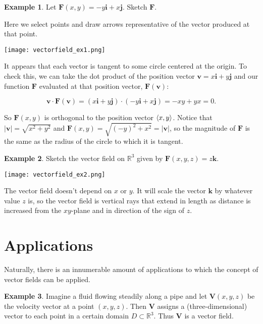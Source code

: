 \documentclass[11pt,oneside,english]{amsart}
\theoremstyle{definition}
\newtheorem*{example}{Example}
\newcommand{\R}{\mathbb{R}}
\def\<#1>{\mathinner{\langle#1\rangle}}
\begin{document}
\begin{example}
Let $\mathbf{F}(x,y)=-y\mathbf{i}+x\mathbf{j}$. Sketch $\mathbf{F}$.

Here we select points and draw arrows representative of the vector produced at that point.

\begin{center}
\texttt{[image: vectorfield\_ex1.png]}
\end{center}

It appears that each vector is tangent to some circle centered at the origin. To check this, we can take the dot product of the position vector $\mathbf{v}=x\mathbf{i}+y\mathbf{j}$ and our function $\mathbf{F}$ evaluated at that position vector, $\mathbf{F}(\mathbf{v})$:

\[
\mathbf{v}\cdot\mathbf{F}(\mathbf{v})=(x\mathbf{i}+y\mathbf{j})\cdot(-y\mathbf{i}+x\mathbf{j})=-xy+yx=0.
\]

So $\mathbf{F}(x,y)$ is orthogonal to the position vector $\<x,y>$. Notice that $|\mathbf{v}|=\sqrt{x^2+y^2}$ and $\mathbf{F}(x,y)=\sqrt{(-y)^2+x^2}=|\mathbf{v}|$, so the magnitude of $\mathbf{F}$ is the same as the radius of the circle to which it is tangent.
\end{example}

\begin{example}
Sketch the vector field on $\R^3$ given by $\mathbf{F}(x,y,z)=z\mathbf{k}$.

\begin{center}
\texttt{[image: vectorfield\_ex2.png]}
\end{center}

The vector field doesn't depend on $x$ or $y$. It will scale the vector $\mathbf{k}$ by whatever value $z$ is, so the vector field is vertical rays that extend in length as distance is increased from the $xy$-plane and in direction of the sign of $z$.
\end{example}


\section*{Applications}

Naturally, there is an innumerable amount of applications to which the concept of vector fields can be applied. 

\begin{example}
Imagine a fluid flowing steadily along a pipe and let $\mathbf{V}(x,y,z)$ be the velocity vector at a point $(x,y,z)$. Then $\mathbf{V}$ assigns a (three-dimensional) vector to each point in a certain domain $D\subset\R^3$. Thus $\mathbf{V}$ is a vector field.
\end{example}
\end{document}

